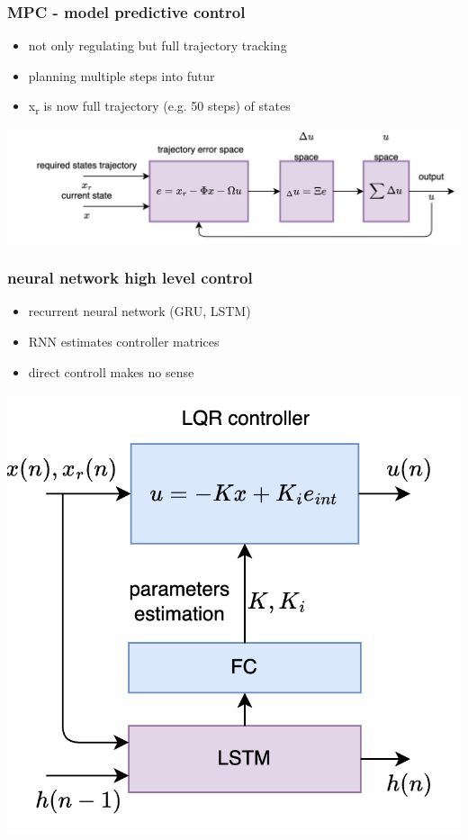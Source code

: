 \documentclass{beamer}
\begin{document}
\begin{frame}
  \frametitle{\bf MPC - model predictive control}

  \begin{itemize}
    \item not only regulating but full trajectory tracking
    \item planning multiple steps into futur
    \item x\textsubscript{r} is now full trajectory (e.g. 50 steps) of states
  \end{itemize}

  {\centering \includegraphics[scale=0.6]{../diagrams/controll/control-mpc.png}}

\end{frame}




\begin{frame}
  \frametitle{\bf neural network high level control}

  \begin{itemize}
    \item recurrent neural network (GRU, LSTM) 
    \item RNN estimates controller matrices
    \item direct controll makes no sense
  \end{itemize}

  {\centering \includegraphics[scale=0.6]{../diagrams/controll/control-neural_netwok.png}}

\end{frame}
\end{document}
